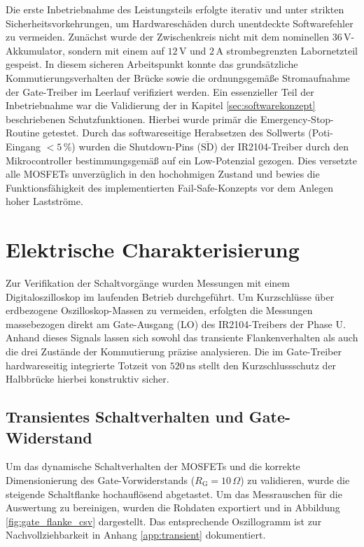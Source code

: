 Die erste Inbetriebnahme des Leistungsteils erfolgte iterativ und unter strikten Sicherheitsvorkehrungen, um Hardwareschäden durch unentdeckte Softwarefehler zu vermeiden. Zunächst wurde der Zwischenkreis nicht mit dem nominellen $36\,\mathrm{V}$-Akkumulator, sondern mit einem auf $12\,\mathrm{V}$ und $2\,\mathrm{A}$ strombegrenzten Labornetzteil gespeist. In diesem sicheren Arbeitspunkt konnte das grundsätzliche Kommutierungsverhalten der Brücke sowie die ordnungsgemäße Stromaufnahme der Gate-Treiber im Leerlauf verifiziert werden.
Ein essenzieller Teil der Inbetriebnahme war die Validierung der in Kapitel \ref{sec:softwarekonzept} beschriebenen Schutzfunktionen. Hierbei wurde primär die Emergency-Stop-Routine getestet. Durch das softwareseitige Herabsetzen des Sollwerts (Poti-Eingang $< 5\,\%$) wurden die Shutdown-Pins ($\overline{\mathrm{SD}}$) der IR2104-Treiber durch den Mikrocontroller bestimmungsgemäß auf ein Low-Potenzial gezogen. Dies versetzte alle MOSFETs unverzüglich in den hochohmigen Zustand und bewies die Funktionsfähigkeit des implementierten Fail-Safe-Konzepts vor dem Anlegen hoher Lastströme.
\section{Elektrische Charakterisierung}
\label{sec:elektrische_messungen}

Zur Verifikation der Schaltvorgänge wurden Messungen mit einem Digitaloszilloskop im laufenden Betrieb durchgeführt. Um Kurzschlüsse über erdbezogene Oszilloskop-Massen zu vermeiden, erfolgten die Messungen massebezogen direkt am Gate-Ausgang (LO) des IR2104-Treibers der Phase U. Anhand dieses Signals lassen sich sowohl das transiente Flankenverhalten als auch die drei Zustände der Kommutierung präzise analysieren. Die im Gate-Treiber hardwareseitig integrierte Totzeit von $520\,\mathrm{ns}$ stellt den Kurzschlussschutz der Halbbrücke hierbei konstruktiv sicher.

\subsection{Transientes Schaltverhalten und Gate-Widerstand}
\label{subsec:messung_schaltflanke}

Um das dynamische Schaltverhalten der MOSFETs und die korrekte Dimensionierung des Gate-Vorwiderstands ($R_{\mathrm{G}} = 10\,\Omega$) zu validieren, wurde die steigende Schaltflanke hochauflösend abgetastet. Um das Messrauschen für die Auswertung zu bereinigen, wurden die Rohdaten exportiert und in Abbildung \ref{fig:gate_flanke_csv} dargestellt. Das entsprechende Oszillogramm ist zur Nachvollziehbarkeit in Anhang \ref{app:transient} dokumentiert.

